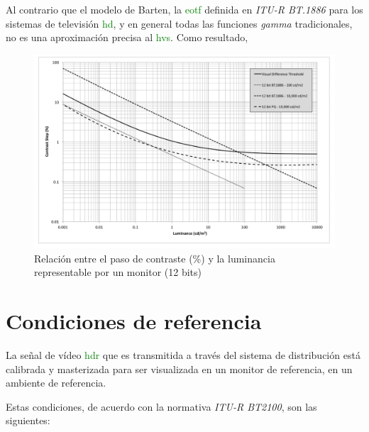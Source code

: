 \documentclass[a4paper, 12pt]{report}
\begin{document}
Al contrario que el modelo de Barten, la \textcolor{green}{eotf} definida en \textit{ITU-R BT.1886} para los sistemas de televisión \textcolor{green}{hd}, y en general todas las funciones \textit{gamma} tradicionales, no es una aproximación precisa al \textcolor{green}{hvs}. Como resultado, 
\begin{figure}[H]
  \centering
  \includegraphics[width=12cm, keepaspectratio]{img/4_Formatos_de_TV_HDR/4_4_Agudeza_visual/2_barten_12bits.png}
  \caption{Relación entre el paso de contraste (\%) y la luminancia representable por un monitor (12 bits)}
  \label{fig:barten_12}
\end{figure}


\section{Condiciones de referencia}
\label{sec:condiciones_referencia}
    La  señal de vídeo \textcolor{green}{hdr} que es transmitida a través del sistema de distribución está calibrada y masterizada para ser visualizada en un monitor  de referencia, en un ambiente de referencia.
    
    Estas condiciones, de acuerdo con la normativa \textit{ ITU-R BT2100}, son las siguientes:
\end{document}
